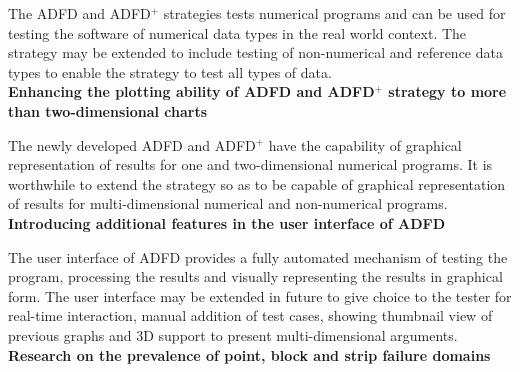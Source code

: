The ADFD and ADFD$^+$ strategies tests numerical programs and can be used for testing the software of numerical data types in the real world context. The strategy may be extended to include testing of non-numerical and reference data types to enable the strategy to test all types of data. \\






\textbf{Enhancing the plotting ability of ADFD and ADFD$^+$ strategy to more than two-dimensional charts}

The newly developed ADFD and ADFD$^+$ have the capability of graphical representation of results for one and two-dimensional numerical programs. It is worthwhile to extend the strategy so as to be capable of graphical representation of results for multi-dimensional numerical and non-numerical programs. \\

\textbf{Introducing additional features in the user interface of ADFD}

The user interface of ADFD provides a fully automated mechanism of testing the program, processing the results and visually representing the results in graphical form. The user interface may be extended in future to give choice to the tester for real-time interaction, manual addition of test cases, showing thumbnail view of previous graphs and 3D support to present multi-dimensional arguments.\\





\textbf{Research on the prevalence of point, block and strip failure domains}

